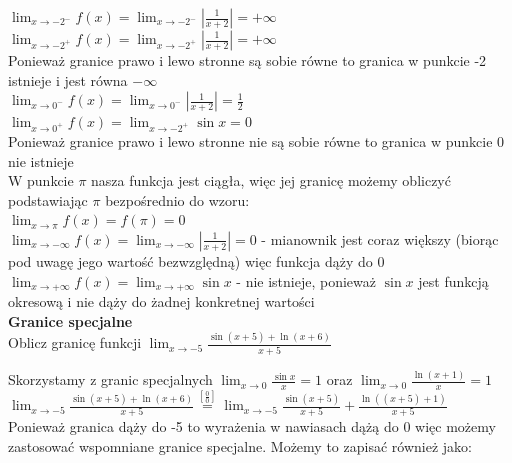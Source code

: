 \documentclass[12pt]{article}
\begin{document}
	\noindent $\lim_{x \to -2^{-}} f(x) = \lim_{x \to -2^{-}} |\frac{1}{x+2}| = +\infty$ \\
	\noindent $\lim_{x \to -2^{+}} f(x) = \lim_{x \to -2^{+}} |\frac{1}{x+2}| = +\infty$ \\
	\noindent Ponieważ granice prawo i lewo stronne są sobie równe to granica w punkcie -2 istnieje i jest równa $-\infty$ \\

	\noindent $\lim_{x \to 0^{-}} f(x) = \lim_{x \to 0^{-}} |\frac{1}{x+2}| = \frac{1}{2}$ \\
	\noindent $\lim_{x \to 0^{+}} f(x) = \lim_{x \to -2^{+}} \sin{x} = 0$ \\
	\noindent Ponieważ granice prawo i lewo stronne nie są sobie równe to granica w punkcie 0 nie istnieje \\

	\noindent W punkcie $\pi$ nasza funkcja jest ciągła, więc jej granicę możemy obliczyć podstawiając $\pi$ bezpośrednio do wzoru: \\
	\noindent $\lim_{x \to \pi} f(x) = f(\pi) = 0$ \\

	\noindent $\lim_{x \to -\infty} f(x) = \lim_{x \to -\infty} |\frac{1}{x+2}| = 0$ - mianownik jest coraz większy (biorąc pod uwagę jego wartość bezwzględną) więc funkcja dąży do 0 \\

	\noindent $\lim_{x \to +\infty} f(x) = \lim_{x \to +\infty} \sin{x}$ - nie istnieje, ponieważ $\sin{x}$ jest funkcją okresową i nie dąży do żadnej konkretnej wartości \\


	\noindent \textbf{Granice specjalne} \\

	\noindent Oblicz granicę funkcji $\lim_{x \to -5} \frac{\sin(x + 5) + \ln(x + 6)}{x + 5}$

	\noindent Skorzystamy z granic specjalnych $\lim_{x \to 0} \frac{\sin{x}}{x} = 1$ oraz $\lim_{x \to 0} \frac{\ln(x + 1)}{x} = 1$ \\

	\noindent $\lim_{x \to -5} \frac{\sin(x + 5) + \ln(x + 6)}{x + 5} \stackrel{[\frac{0}{0}]}{=} \lim_{x \to -5} \frac{\sin(x + 5)}{x + 5} + \frac{\ln((x + 5) + 1)}{x + 5}$ \\

	\noindent Ponieważ granica dąży do -5 to wyrażenia w nawiasach dążą do 0 więc możemy zastosować wspomniane granice specjalne. Możemy to zapisać również jako: \\
\end{document}
